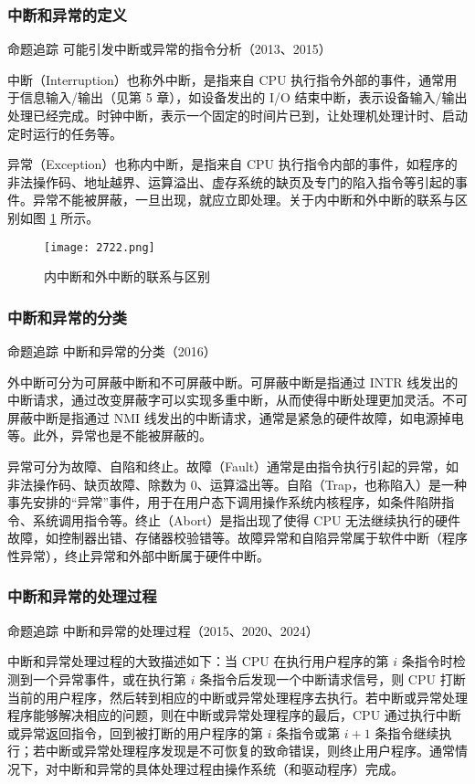 \documentclass{ctexbook}
\begin{document}
	\subsubsection{中断和异常的定义}
	\colorbox{gray!20}{命题追踪 \enspace 可能引发中断或异常的指令分析（2013、2015）}
	
	中断（Interruption）也称外中断，是指来自 CPU 执行指令外部的事件，通常用于信息输入/输出（见第 5 章），如设备发出的 I/O 结束中断，表示设备输入/输出处理已经完成。时钟中断，表示一个固定的时间片已到，让处理机处理计时、启动定时运行的任务等。
	
	异常（Exception）也称内中断，是指来自 CPU 执行指令内部的事件，如程序的非法操作码、地址越界、运算溢出、虚存系统的缺页及专门的陷入指令等引起的事件。异常不能被屏蔽，一旦出现，就应立即处理。关于内中断和外中断的联系与区别如图 \ref{fig:t} 所示。
	
	\begin{figure}[h]
		\centering
		\label{fig:t}
		\texttt{[image: 2722.png]}
		\caption{内中断和外中断的联系与区别}
	\end{figure}
	
	\subsubsection{中断和异常的分类}
	\colorbox{gray!20}{命题追踪 \enspace 中断和异常的分类（2016）}
	
	外中断可分为可屏蔽中断和不可屏蔽中断。可屏蔽中断是指通过 INTR 线发出的中断请求，通过改变屏蔽字可以实现多重中断，从而使得中断处理更加灵活。不可屏蔽中断是指通过 NMI 线发出的中断请求，通常是紧急的硬件故障，如电源掉电等。此外，异常也是不能被屏蔽的。
	
	
	异常可分为故障、自陷和终止。故障（Fault）通常是由指令执行引起的异常，如非法操作码、缺页故障、除数为 0、运算溢出等。自陷（Trap，也称陷入）是一种事先安排的“异常”事件，用于在用户态下调用操作系统内核程序，如条件陷阱指令、系统调用指令等。终止（Abort）是指出现了使得 CPU 无法继续执行的硬件故障，如控制器出错、存储器校验错等。故障异常和自陷异常属于软件中断（程序性异常），终止异常和外部中断属于硬件中断。
	
	\subsubsection{中断和异常的处理过程}
	\colorbox{gray!20}{命题追踪 \enspace 中断和异常的处理过程（2015、2020、2024）}
	
	中断和异常处理过程的大致描述如下：当 CPU 在执行用户程序的第 \(i\) 条指令时检测到一个异常事件，或在执行第 \(i\) 条指令后发现一个中断请求信号，则 CPU 打断当前的用户程序，然后转到相应的中断或异常处理程序去执行。若中断或异常处理程序能够解决相应的问题，则在中断或异常处理程序的最后，CPU 通过执行中断或异常返回指令，回到被打断的用户程序的第 \(i\) 条指令或第 \(i + 1\) 条指令继续执行；若中断或异常处理程序发现是不可恢复的致命错误，则终止用户程序。通常情况下，对中断和异常的具体处理过程由操作系统（和驱动程序）完成。
	
\end{document}

